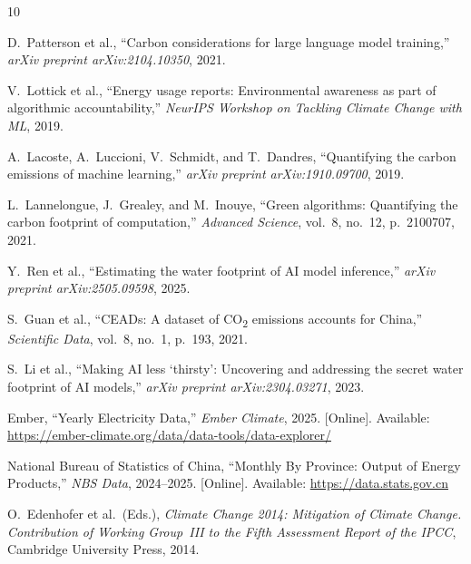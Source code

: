 \documentclass[11pt,a4paper]{article}
\begin{document}
\begin{thebibliography}{10}

D.~Patterson et al.,
``Carbon considerations for large language model training,''
\emph{arXiv preprint arXiv:2104.10350}, 2021.

V.~Lottick et al.,
``Energy usage reports: Environmental awareness as part of algorithmic
accountability,''
\emph{NeurIPS Workshop on Tackling Climate Change with ML}, 2019.

A.~Lacoste, A.~Luccioni, V.~Schmidt, and T.~Dandres,
``Quantifying the carbon emissions of machine learning,''
\emph{arXiv preprint arXiv:1910.09700}, 2019.

L.~Lannelongue, J.~Grealey, and M.~Inouye,
``Green algorithms: Quantifying the carbon footprint of computation,''
\emph{Advanced Science}, vol.~8, no.~12, p.~2100707, 2021.

Y.~Ren et al.,
``Estimating the water footprint of AI model inference,''
\emph{arXiv preprint arXiv:2505.09598}, 2025.

S.~Guan et al.,
``CEADs: A dataset of CO\textsubscript{2} emissions accounts for China,''
\emph{Scientific Data}, vol.~8, no.~1, p.~193, 2021.

S.~Li et al.,
``Making AI less `thirsty': Uncovering and addressing the secret water
footprint of AI models,''
\emph{arXiv preprint arXiv:2304.03271}, 2023.

Ember,
``Yearly Electricity Data,''
\emph{Ember Climate}, 2025.
[Online]. Available: \url{https://ember-climate.org/data/data-tools/data-explorer/}

National Bureau of Statistics of China,
``Monthly By Province: Output of Energy Products,''
\emph{NBS Data}, 2024--2025.
[Online]. Available: \url{https://data.stats.gov.cn}

O.~Edenhofer et al.\ (Eds.),
\emph{Climate Change 2014: Mitigation of Climate Change.
Contribution of Working Group~III to the Fifth Assessment Report of the IPCC},
Cambridge University Press, 2014.

\end{thebibliography}
\end{document}
